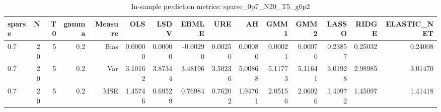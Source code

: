 \begin{table}[!htbp]\centering
\caption{In-sample prediction metrics: sparse_0p7_N20_T5_g0p2}
\label{tab:table2_sparse_0p7_N20_T5_g0p2}
\begin{tabular}{lrrrrrrrrrrrrrr}
\hline
sparse & N & T0 & gamma & Measure & OLS & LSDV & EBMLE & URE & AH & GMM1 & GMM2 & LASSO & RIDGE & ELASTIC_NET \\
\hline
0.7 & 20 & 5 & 0.2 & Bias & 0.00000 & 0.00000 & -0.00290 & 0.00250 & 0.00080 & 0.00021 & 0.00070 & 0.23857 & 0.25032 & 0.24008 \\
0.7 & 20 & 5 & 0.2 & Var & 3.10162 & 3.87344 & 3.48196 & 3.50236 & 5.00868 & 5.11773 & 5.11641 & 3.01928 & 2.98985 & 3.01470 \\
0.7 & 20 & 5 & 0.2 & MSE & 1.45746 & 0.69529 & 0.76984 & 0.76202 & 1.94761 & 2.05156 & 2.06026 & 1.40972 & 1.45097 & 1.41418 \\
\hline
\end{tabular}
\end{table}

